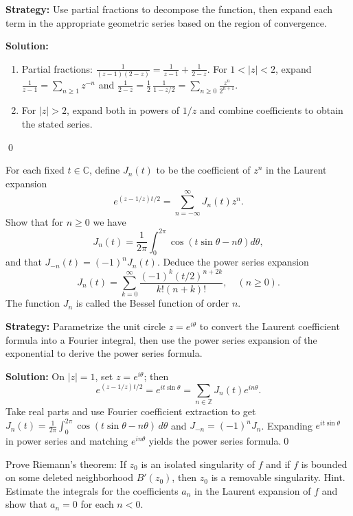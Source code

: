 \noindent\textbf{Strategy:} Use partial fractions to decompose the function, then expand each term in the appropriate geometric series based on the region of convergence.

\bigskip\noindent\textbf{Solution:}
\begin{enumerate}[label=(\alph*)]
\item Partial fractions: $\frac{1}{(z-1)(2-z)}=\frac{1}{z-1}+\frac{1}{2-z}$. For $1<|z|<2$, expand $\frac{1}{z-1}=\sum_{n\ge1}z^{-n}$ and $\frac{1}{2-z}=\frac{1}{2}\,\frac{1}{1-z/2}=\sum_{n\ge0}\frac{z^n}{2^{n+1}}$.
\item For $|z|>2$, expand both in powers of $1/z$ and combine coefficients to obtain the stated series.
\end{enumerate}\qed


\begin{problembox}
\begin{problemstatement}
For each fixed \( t \in \mathbb{C} \), define \( J_n(t) \) to be the coefficient of \( z^n \) in the Laurent expansion
\[ e^{(z - 1/z)t/2} = \sum_{n=-\infty}^{\infty} J_n(t) z^n. \]
Show that for \( n \geq 0 \) we have
\[ J_n(t) = \frac{1}{2\pi} \int_0^{2\pi} \cos (t \sin \theta - n \theta) d\theta, \]
and that \( J_{-n}(t) = (-1)^n J_n(t) \). Deduce the power series expansion
\[ J_n(t) = \sum_{k=0}^{\infty} \frac{(-1)^k (t/2)^{n + 2k}}{k! (n + k)!}, \quad (n \geq 0). \]
The function \( J_n \) is called the Bessel function of order \( n \).
\end{problemstatement}
\end{problembox}

\noindent\textbf{Strategy:} Parametrize the unit circle \( z = e^{i\theta} \) to convert the Laurent coefficient formula into a Fourier integral, then use the power series expansion of the exponential to derive the power series formula.

\bigskip\noindent\textbf{Solution:}
On $|z|=1$, set $z=e^{i\theta}$; then
\[e^{(z-1/z)t/2}=e^{i t\sin\theta}=\sum_{n\in\mathbb Z} J_n(t)e^{in\theta}.
\]
Take real parts and use Fourier coefficient extraction to get $J_n(t)=\frac{1}{2\pi}\int_0^{2\pi}\cos(t\sin\theta-n\theta)\,d\theta$ and $J_{-n}=(-1)^nJ_n$. Expanding $e^{i t\sin\theta}$ in power series and matching $e^{in\theta}$ yields the power series formula.\qed


\begin{problembox}
\begin{problemstatement}
Prove Riemann's theorem: If \( z_0 \) is an isolated singularity of \( f \) and if \( f \) is bounded on some deleted neighborhood \( B'(z_0) \), then \( z_0 \) is a removable singularity. Hint. Estimate the integrals for the coefficients \( a_n \) in the Laurent expansion of \( f \) and show that \( a_n = 0 \) for each \( n < 0 \).
\end{problemstatement}
\end{problembox}

